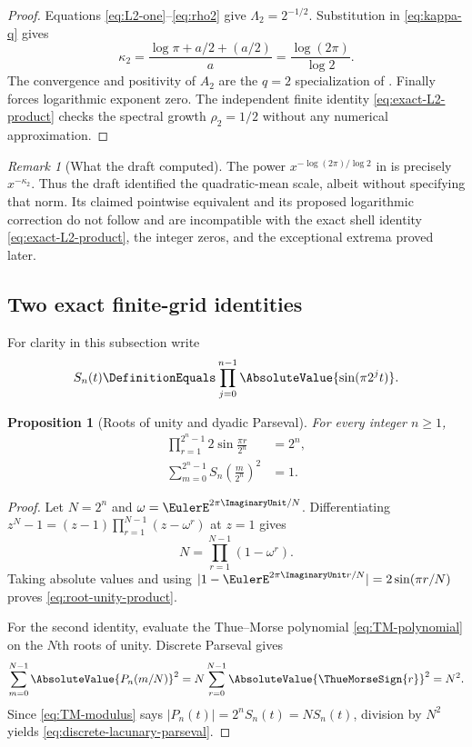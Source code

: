\documentclass[11pt,oneside]{article}
\numberwithin{equation}{section}
\newtheorem{proposition}[theorem]{Proposition}
\theoremstyle{definition}
\theoremstyle{remark}
\newtheorem{remark}[theorem]{Remark}
\begin{document}
\begin{proof}
Equations \eqref{eq:L2-one}--\eqref{eq:rho2} give
$\Lambda_2=2^{-1/2}$.  Substitution in \eqref{eq:kappa-q} gives
\[
 \kappa_2
 =\frac{\log\pi+a/2+(a/2)}{a}
 =\frac{\log(2\pi)}{\log2}.
\]
The convergence and positivity of $A_2$ are the $q=2$ specialization of
.  Finally  forces logarithmic exponent
zero.  The independent finite identity \eqref{eq:exact-L2-product} checks the spectral
growth $\rho_2=1/2$ without any numerical approximation.
\end{proof}

\begin{remark}[What the draft computed]
The power $x^{-\log(2\pi)/\log2}$ in \cite{decay-draft} is precisely
$x^{-\kappa_2}$.  Thus the draft identified the quadratic-mean scale, albeit without
specifying that norm.  Its claimed pointwise equivalent and its proposed logarithmic
correction do not follow and are incompatible with the exact shell identity
\eqref{eq:exact-L2-product}, the integer zeros, and the exceptional extrema proved later.
\end{remark}

\subsection{Two exact finite-grid identities}

For clarity in this subsection write
\[
 S_n(t)\DefinitionEquals\prod_{j=0}^{n-1}\AbsoluteValue{\sin(\pi2^jt)}.
\]

\begin{proposition}[Roots of unity and dyadic Parseval]
\label{prop:grid-identities}
For every integer $n\ge1$,
\begin{align}
 \prod_{r=1}^{2^n-1}2\sin\frac{\pi r}{2^n}&=2^n,
 \label{eq:root-unity-product}\\
 \sum_{m=0}^{2^n-1}S_n\!\left(\frac{m}{2^n}\right)^2&=1.
 \label{eq:discrete-lacunary-parseval}
\end{align}
\end{proposition}

\begin{proof}
Let $N=2^n$ and $\omega=\EulerE^{2\pi\ImaginaryUnit/N}$.  Differentiating
$z^N-1=(z-1)\prod_{r=1}^{N-1}(z-\omega^r)$ at $z=1$ gives
\[
 N=\prod_{r=1}^{N-1}(1-\omega^r).
\]
Taking absolute values and using $|1-\EulerE^{2\pi\ImaginaryUnit r/N}|=2\sin(\pi r/N)$ proves
\eqref{eq:root-unity-product}.

For the second identity, evaluate the Thue--Morse polynomial
\eqref{eq:TM-polynomial} on the $N$th roots of unity.  Discrete Parseval gives
\[
 \sum_{m=0}^{N-1}\AbsoluteValue{P_n(m/N)}^2
 =N\sum_{r=0}^{N-1}\AbsoluteValue{\ThueMorseSign{r}}^2=N^2.
\]
Since \eqref{eq:TM-modulus} says $|P_n(t)|=2^nS_n(t)=NS_n(t)$, division by
$N^2$ yields \eqref{eq:discrete-lacunary-parseval}.
\end{proof}
\end{document}
